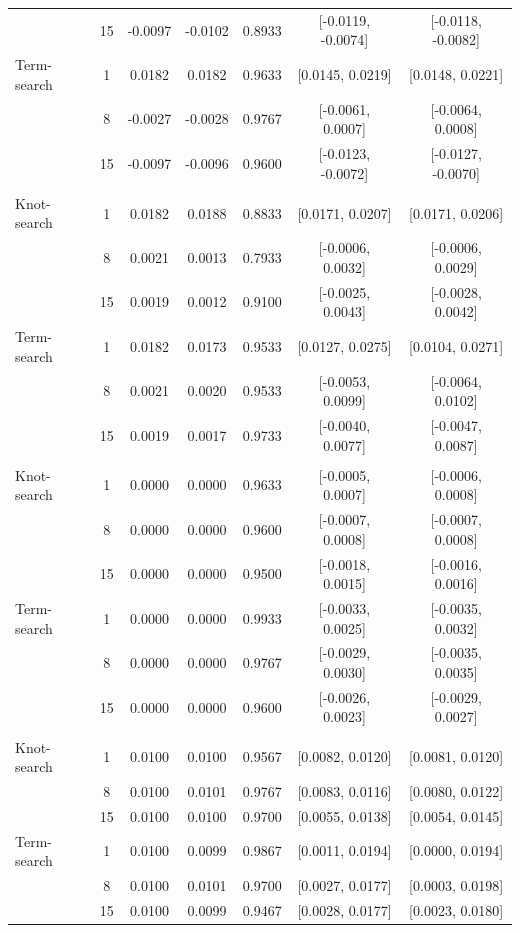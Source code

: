\documentclass{article}
\begin{document}
\begin{table}[ht]
\begin{tabular}{l c c c c c c}
 & 15 & -0.0097 & -0.0102 & 0.8933 & [-0.0119, -0.0074] & [-0.0118, -0.0082] \\
Term-search & 1 & 0.0182 & 0.0182 & 0.9633 & [0.0145, 0.0219] & [0.0148, 0.0221] \\
 & 8 & -0.0027 & -0.0028 & 0.9767 & [-0.0061, 0.0007] & [-0.0064, 0.0008] \\
 & 15 & -0.0097 & -0.0096 & 0.9600 & [-0.0123, -0.0072] & [-0.0127, -0.0070] \\
\addlinespace
\multicolumn{7}{l}{\emph{Bimodal 2}}\\
Knot-search & 1 & 0.0182 & 0.0188 & 0.8833 & [0.0171, 0.0207] & [0.0171, 0.0206] \\
 & 8 & 0.0021 & 0.0013 & 0.7933 & [-0.0006, 0.0032] & [-0.0006, 0.0029] \\
 & 15 & 0.0019 & 0.0012 & 0.9100 & [-0.0025, 0.0043] & [-0.0028, 0.0042] \\
Term-search & 1 & 0.0182 & 0.0173 & 0.9533 & [0.0127, 0.0275] & [0.0104, 0.0271] \\
 & 8 & 0.0021 & 0.0020 & 0.9533 & [-0.0053, 0.0099] & [-0.0064, 0.0102] \\
 & 15 & 0.0019 & 0.0017 & 0.9733 & [-0.0040, 0.0077] & [-0.0047, 0.0087] \\
\addlinespace
\multicolumn{7}{l}{\emph{Constant null effects}}\\
Knot-search & 1 & 0.0000 & 0.0000 & 0.9633 & [-0.0005, 0.0007] & [-0.0006, 0.0008] \\
 & 8 & 0.0000 & 0.0000 & 0.9600 & [-0.0007, 0.0008] & [-0.0007, 0.0008] \\
 & 15 & 0.0000 & 0.0000 & 0.9500 & [-0.0018, 0.0015] & [-0.0016, 0.0016] \\
Term-search & 1 & 0.0000 & 0.0000 & 0.9933 & [-0.0033, 0.0025] & [-0.0035, 0.0032] \\
 & 8 & 0.0000 & 0.0000 & 0.9767 & [-0.0029, 0.0030] & [-0.0035, 0.0035] \\
 & 15 & 0.0000 & 0.0000 & 0.9600 & [-0.0026, 0.0023] & [-0.0029, 0.0027] \\
\addlinespace
\multicolumn{7}{l}{\emph{Constant positive effects}}\\
Knot-search & 1 & 0.0100 & 0.0100 & 0.9567 & [0.0082, 0.0120] & [0.0081, 0.0120] \\
 & 8 & 0.0100 & 0.0101 & 0.9767 & [0.0083, 0.0116] & [0.0080, 0.0122] \\
 & 15 & 0.0100 & 0.0100 & 0.9700 & [0.0055, 0.0138] & [0.0054, 0.0145] \\
Term-search & 1 & 0.0100 & 0.0099 & 0.9867 & [0.0011, 0.0194] & [0.0000, 0.0194] \\
 & 8 & 0.0100 & 0.0101 & 0.9700 & [0.0027, 0.0177] & [0.0003, 0.0198] \\
 & 15 & 0.0100 & 0.0099 & 0.9467 & [0.0028, 0.0177] & [0.0023, 0.0180] \\
\bottomrule
\end{tabular}
\end{table}
\end{document}
